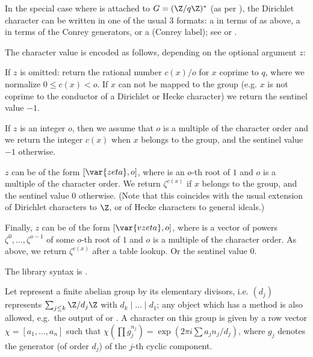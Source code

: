 In the special case where  is attached to $G = (\Z/q\Z)^*$
(as per ), the Dirichlet
character  can be written in one of the usual 3 formats: a 
in terms of  as above, a  in terms of the Conrey
generators, or a  (Conrey label);
see  or .

The character value is encoded as follows, depending on the optional
argument $z$:

\item If $z$ is omitted: return the rational number $c(x)/o$ for $x$ coprime
to $q$, where we normalize $0\leq c(x) < o$. If $x$ can not be mapped to the
group (e.g. $x$ is not coprime to the conductor of a Dirichlet or Hecke
character) we return the sentinel value $-1$.

\item If $z$ is an integer $o$, then we assume that $o$ is a multiple of the
character order and we return the integer $c(x)$ when $x$ belongs
to the group, and the sentinel value $-1$ otherwise.

\item $z$ can be of the form $[\var{zeta}, o]$, where 
is an $o$-th root of $1$ and $o$ is a multiple of the character order.
We return $\zeta^{c(x)}$ if $x$ belongs to the group, and the sentinel
value $0$ otherwise. (Note that this coincides  with the usual extension
of Dirichlet characters to $\Z$, or of Hecke characters to general ideals.)

\item Finally, $z$ can be of the form $[\var{vzeta}, o]$, where
 is a vector of powers $\zeta^0, \dots, \zeta^{o-1}$
of some $o$-th root of $1$ and $o$ is a multiple of the character order.
As above, we return $\zeta^{c(x)}$ after a table lookup. Or the sentinel
value $0$.

The library syntax is .

\label{se:charker}
Let  represent a finite abelian group by its elementary
divisors, i.e. $(d_j)$ represents $\sum_{j \leq k} \Z/d_j\Z$ with $d_k
\mid \dots \mid d_1$; any object which has a  method is also
allowed, e.g.~the output of  or . A character
on this group is given by a row vector $\chi = [a_1,\ldots,a_n]$ such that
$\chi(\prod g_j^{n_j}) = \exp(2\pi i\sum a_j n_j / d_j)$, where $g_j$ denotes
the generator (of order $d_j$) of the $j$-th cyclic component.

